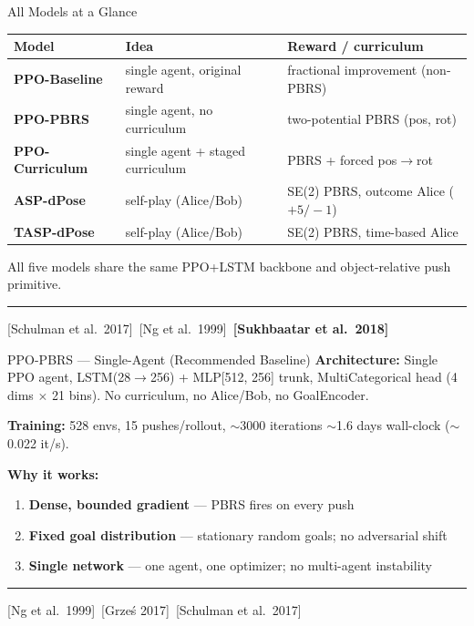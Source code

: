 \documentclass[aspectratio=169,xcolor=dvipsnames,t]{beamer}
\newcommand{\litfooter}[1]{%
  \vspace{2pt}%
  \hrule%
  \vspace{2pt}%
  {\tiny\color{LightDarkGrey} #1}%
}
\begin{document}
\begin{frame}[t]{All Models at a Glance}
  \centering\small
  \begin{tabular}{lll}
    \toprule
    \textbf{Model} & \textbf{Idea} & \textbf{Reward / curriculum} \\
    \midrule
    \textbf{PPO-Baseline} & single agent, original reward & fractional improvement (non-PBRS) \\
    \rowcolor{hlgreen!15}
    \textbf{PPO-PBRS} & single agent, no curriculum & two-potential PBRS (pos, rot) \\
    \textbf{PPO-Curriculum} & single agent + staged curriculum & PBRS + forced pos$\to$rot \\
    \textbf{ASP-dPose} & self-play (Alice/Bob) & SE(2) PBRS, outcome Alice ($+5/-1$) \\
    \textbf{TASP-dPose} & self-play (Alice/Bob) & SE(2) PBRS, time-based Alice \\
    \bottomrule
  \end{tabular}

  \vspace{6pt}
  {\small All five models share the same PPO+LSTM backbone and object-relative push primitive.}
  \vfill\litfooter{[Schulman et al.\ 2017]~[Ng et al.\ 1999]~\textbf{[Sukhbaatar et al.\ 2018]}}
\end{frame}

\begin{frame}[t]{PPO-PBRS — Single-Agent (Recommended Baseline)}
  \small
  \textbf{Architecture:} Single PPO agent, LSTM(28$\to$256) + MLP[512, 256] trunk, MultiCategorical head (4 dims $\times$ 21 bins). No curriculum, no Alice/Bob, no GoalEncoder.

  \textbf{Training:} 528 envs, 15 pushes/rollout, $\sim$3000 iterations $\sim$1.6 days wall-clock ($\sim$0.022 it/s).

  \textbf{Why it works:}
  \begin{enumerate}
    \item \textbf{Dense, bounded gradient} — PBRS fires on every push
    \item \textbf{Fixed goal distribution} — stationary random goals; no adversarial shift
    \item \textbf{Single network} — one agent, one optimizer; no multi-agent instability
  \end{enumerate}

  \vfill\litfooter{[Ng et al.\ 1999]~[Grze\'s 2017]~[Schulman et al.\ 2017]}
\end{frame}
\end{document}
